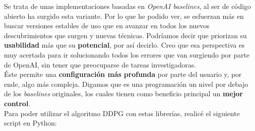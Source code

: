 \documentclass[11pt,fleqn]{book} %
\begin{document}
Se trata de unas implementaciones basadas en \textit{OpenAI baselines}, al ser de código abierto ha surgido esta variante. Por lo que he podido ver, se esfuerzan más en buscar versiones estables de uso que en avanzar en todos los nuevos descubrimientos que surgen y nuevas técnicas. Podríamos decir que priorizan su \textbf{usabilidad} más que su \textbf{potencial}, por así decirlo. Creo que esa perspectiva es muy acertada para ir solucionando todos los errores que van surgiendo por parte de OpenAI, sin tener que preocuparse de tareas investigadoras. \\

Éste permite una \textbf{configuración más profunda} por parte del usuario y, por ende, algo más compleja. Digamos que es una programación un nivel por debajo de los \textit{baselines} originales, los cuales tienen como beneficio principal un \textbf{mejor control}. \\

Para poder utilizar el algoritmo DDPG con estas librerías, realicé el siguiente script en Python:\\
\end{document}
